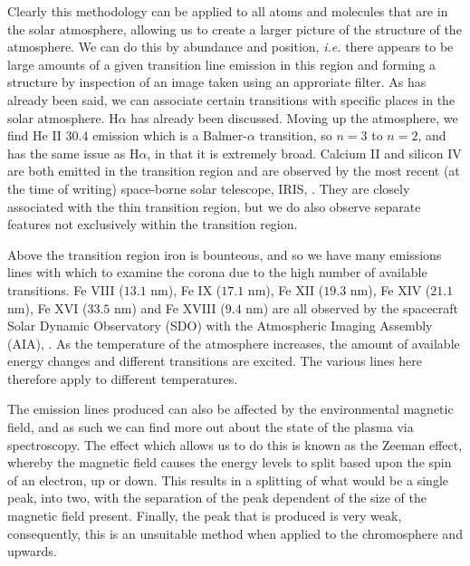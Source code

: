 Clearly this methodology can be applied to all atoms and molecules that are in the solar atmosphere, allowing us to create a larger picture of the structure of the atmosphere.
We can do this by abundance and position, \emph{i.e.} there appears to be large amounts of a given transition line emission in this region and forming a structure by inspection of an image taken using an approriate filter.
As has already been said, we can associate certain transitions with specific places in the solar atmosphere.
H$\alpha$ has already been discussed.
Moving up the atmosphere, we find He II $30.4$ emission which is a Balmer-$\alpha$ transition, so $n=3$ to $n=2$, and has the same issue as H$\alpha$, in that it is extremely broad.
Calcium II and silicon IV are both emitted in the transition region and are observed by the most recent (at the time of writing) space-borne solar telescope, IRIS, \cite{DePontieu2014}.
They are closely associated with the thin transition region, but we do also observe separate features not exclusively within the transition region.

Above the transition region iron is bounteous, and so we have many emissions lines with which to examine the corona due to the high number of available transitions.
Fe VIII ($13.1$ nm), Fe IX ($17.1$ nm), Fe XII ($19.3$ nm), Fe XIV ($21.1$ nm), Fe XVI ($33.5$ nm) and Fe XVIII ($9.4$ nm) are all observed by the spacecraft Solar Dynamic Observatory (SDO) with the Atmospheric Imaging Assembly (AIA), \cite{Schmelz2013}.
As the temperature of the atmosphere increases, the amount of available energy changes and different transitions are excited.
The various lines here therefore apply to different temperatures.

The emission lines produced can also be affected by the environmental magnetic field, and as such we can find more out about the state of the plasma via spectroscopy.
The effect which allows us to do this is known as the Zeeman effect, whereby the magnetic field causes the energy levels to split based upon the spin of an electron, up or down.
This results in a splitting of what would be a single peak, into two, with the separation of the peak dependent of the size of the magnetic field present.
Finally, the peak that is produced is very weak, consequently, this is an unsuitable method when applied to the chromosphere and upwards.


